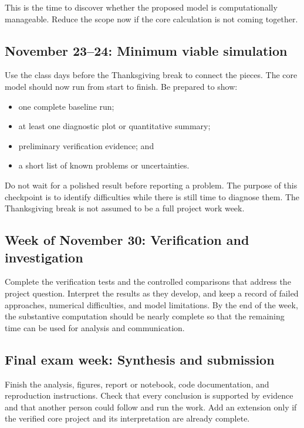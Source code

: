 \documentclass[11pt]{article}
\begin{document}
This is the time to discover whether the proposed model is computationally
manageable. Reduce the scope now if the core calculation is not coming together.

\subsection*{November 23--24: Minimum viable simulation}

Use the class days before the Thanksgiving break to connect the pieces. The core
model should now run from start to finish. Be prepared to show:

\begin{itemize}
  \item one complete baseline run;
  \item at least one diagnostic plot or quantitative summary;
  \item preliminary verification evidence; and
  \item a short list of known problems or uncertainties.
\end{itemize}

Do not wait for a polished result before reporting a problem. The purpose of this
checkpoint is to identify difficulties while there is still time to diagnose
them. The Thanksgiving break is not assumed to be a full project work week.

\subsection*{Week of November 30: Verification and investigation}

Complete the verification tests and the controlled comparisons that address the
project question. Interpret the results as they develop, and keep a record of
failed approaches, numerical difficulties, and model limitations. By the end of
the week, the substantive computation should be nearly complete so that the
remaining time can be used for analysis and communication.

\subsection*{Final exam week: Synthesis and submission}

Finish the analysis, figures, report or notebook, code documentation, and
reproduction instructions. Check that every conclusion is supported by evidence
and that another person could follow and run the work. Add an extension only if
the verified core project and its interpretation are already complete.
\end{document}
